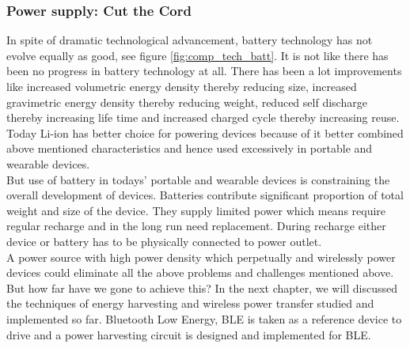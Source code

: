 \documentclass[12pt,a4paper,UKenglish]{report}
\begin{document}

\subsubsection{Power supply: Cut the Cord}

In spite of dramatic technological advancement, battery technology has not evolve equally as good, see figure 
\ref{fig:comp_tech_batt}. It is not like there has been no progress in battery technology at all. There has been a lot improvements 
like increased volumetric energy density thereby reducing size, increased gravimetric energy density thereby 
reducing weight, reduced self discharge thereby increasing life time and increased charged cycle thereby 
increasing reuse\cite{review_energy_harvest}. Today Li-ion has better choice for powering devices because of it better combined 
above mentioned characteristics and hence used excessively in portable and wearable devices. \\

But use of battery in todays'  portable and wearable devices is constraining the overall development of devices. Batteries contribute significant proportion of total weight and size of the device. They supply limited 
power which means require regular recharge and in the long run need replacement. During recharge either device or 
battery has to be physically connected to power outlet. \\

A power source with high power density which perpetually and wirelessly power devices could eliminate 
all the above problems and challenges mentioned above. But how 
far have we gone to achieve this? In the next chapter, we will discussed the techniques of energy harvesting and 
wireless power transfer studied and implemented so far. Bluetooth Low Energy, BLE is taken as a 
reference device to drive and a power harvesting circuit is designed and implemented for BLE. \\

\end{document}
